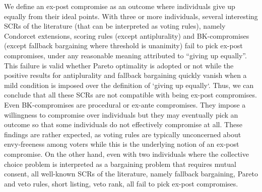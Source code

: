 \documentclass[version=3.21, pagesize, twoside=off, bibliography=totoc, DIV=calc, fontsize=12pt, a4paper]{scrartcl}
\begin{document}

We define an ex-post compromise as an outcome where individuals give up equally from their ideal points. With three or more individuals, several interesting SCRs of the literature (that can be interpreted as voting rules), namely Condorcet extensions, scoring rules (except antiplurality) and BK-compromises (except fallback bargaining where threshold is unanimity) fail to pick ex-post compromises, under any reasonable meaning attributed to “giving up equally”. This failure is valid whether Pareto optimality is adopted or not while the positive results for antiplurality and fallback bargaining quickly vanish when a mild condition is imposed over the definition of `giving up equally`. Thus, we can conclude that all these SCRs are not compatible with being ex-post compromises. Even BK-compromises are procedural or ex-ante compromises. They impose a willingness to compromise over individuals but they may eventually pick an outcome so that some individuals do not effectively compromise at all.
These findings are rather expected, as voting rules are typically unconcerned about envy-freeness among voters while this is the underlying notion of an ex-post compromise. On the other hand, even with two individuals where the collective choice problem is interpreted as a bargaining problem that requires mutual consent, all well-known SCRs of the literature, namely fallback bargaining, Pareto and veto rules, short listing, veto rank, all fail to pick ex-post compromises. 


\newpage



\newpage
\appendix
\end{document}
